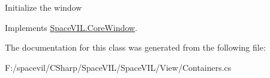 Initialize the window 



Implements \mbox{\hyperlink{class_space_v_i_l_1_1_core_window_aa3cf4ac54d9651b1149584dc81042824}{Space\+V\+I\+L.\+Core\+Window}}.



The documentation for this class was generated from the following file\+:\begin{DoxyCompactItemize}
\item 
F\+:/spacevil/\+C\+Sharp/\+Space\+V\+I\+L/\+Space\+V\+I\+L/\+View/Containers.\+cs\end{DoxyCompactItemize}
